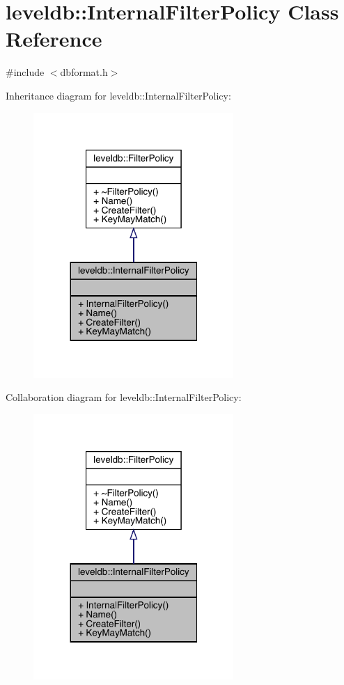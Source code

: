 \hypertarget{classleveldb_1_1_internal_filter_policy}{}\section{leveldb\+::Internal\+Filter\+Policy Class Reference}
\label{classleveldb_1_1_internal_filter_policy}


{\ttfamily \#include $<$dbformat.\+h$>$}



Inheritance diagram for leveldb\+::Internal\+Filter\+Policy\+:
\nopagebreak
\begin{figure}[H]
\begin{center}
\leavevmode
\includegraphics[width=215pt]{classleveldb_1_1_internal_filter_policy__inherit__graph}
\end{center}
\end{figure}


Collaboration diagram for leveldb\+::Internal\+Filter\+Policy\+:
\nopagebreak
\begin{figure}[H]
\begin{center}
\leavevmode
\includegraphics[width=215pt]{classleveldb_1_1_internal_filter_policy__coll__graph}
\end{center}
\end{figure}

